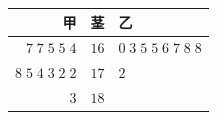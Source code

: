\begin{tabular}{@{}r|c|l@{}}
甲 & 茎 & 乙 \\
\hline
$7\;7\;5\;5\;4$ & $16$ & $0\;3\;5\;5\;6\;7\;8\;8$ \\
$8\;5\;4\;3\;2\;2$ & $17$ & $2$ \\
$3$ & $18$ & \\
\end{tabular}
